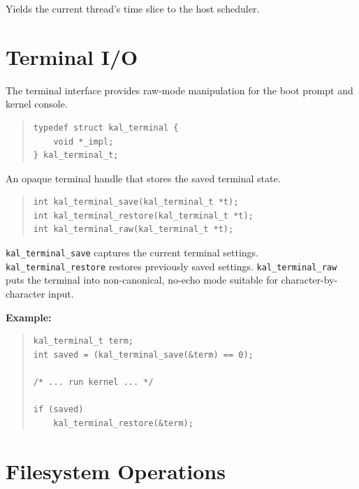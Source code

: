 \documentclass[11pt,twoside]{article}
\begin{document}
Yields the current thread's time slice to the host scheduler.

\newpage
\section{Terminal I/O}
\label{sec:terminal}

The terminal interface provides raw-mode manipulation for the boot
prompt and kernel console.

\begin{quote}
\begin{verbatim}
typedef struct kal_terminal {
    void *_impl;
} kal_terminal_t;
\end{verbatim}
\end{quote}

An opaque terminal handle that stores the saved terminal state.

\begin{quote}
\begin{verbatim}
int kal_terminal_save(kal_terminal_t *t);
int kal_terminal_restore(kal_terminal_t *t);
int kal_terminal_raw(kal_terminal_t *t);
\end{verbatim}
\end{quote}

{\tt kal\_terminal\_save} captures the current terminal settings.
{\tt kal\_terminal\_restore} restores previously saved settings.
{\tt kal\_terminal\_raw} puts the terminal into non-canonical,
no-echo mode suitable for character-by-character input.

\medskip
\noindent
{\bf Example:}
\begin{quote}
\begin{verbatim}
kal_terminal_t term;
int saved = (kal_terminal_save(&term) == 0);

/* ... run kernel ... */

if (saved)
    kal_terminal_restore(&term);
\end{verbatim}
\end{quote}

\newpage
\section{Filesystem Operations}
\label{sec:filesys}
\end{document}
